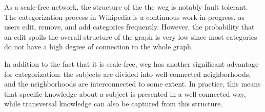 As a scale-free network, the structure of the the \gls{wcg} is notably fault tolerant. The categorization process in Wikipedia is a continuous work-in-progress, as users edit, remove, and add categories frequently. However, the probability that an edit spoils the overall structure of the graph is very low since most categories do not have a high degree of connection to the whole graph.

In addition to the fact that it is scale-free, \gls {wcg} has another significant advantage for categorization: the subjects are divided into well-connected neighborhoods, and the neighborhoods are interconnected to some extent. In practice, this means that specific knowledge about a subject is presented in a well-connected way, while transversal knowledge can also be captured from this structure.